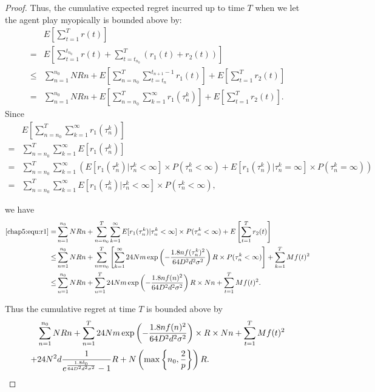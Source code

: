 \begin{proof}
Thus, the cumulative expected regret incurred up to time $T$ when we let the agent play myopically is bounded above by:
\begin{align}
&E\left[\sum_{t=1}^{T}r(t)\right] \nonumber \\
=&E\left[\sum_{t=1}^{t_{n_{0}}} r(t) + \sum_{t=t_{n_{0}}}^{T}(r_1(t)+r_2(t))\right]  \nonumber \\
\leq & \sum_{n=1}^{n_{0}}NRn + E\left[\sum_{n=n_{0}}^{T}\sum_{t=t_{n}}^{t_{n+1}-1}r_1(t)\right]+ E\left[\sum_{t=1}^{T}r_2(t)\right] \nonumber \\
=& \sum_{n=1}^{n_{0}}NRn + E\left[\sum_{n=n_{0}}^{T}\sum_{k=1}^{\infty}r_1(\tau_{n}^{k})\right]+ E\left[\sum_{t=1}^{T}r_2(t)\right]. \label{chap5:equ:r1}
\end{align}
Since
\begin{align}
& E\left[\sum_{n=n_{0}}^{T}\sum_{k=1}^{\infty}r_1(\tau_{n}^{k})\right] \nonumber\\
= &  \sum_{n=n_{0}}^{T}\sum_{k=1}^{\infty}E[r_1(\tau_{n}^{k})] \nonumber \\
= &  \sum_{n=n_{0}}^{T}\sum_{k=1}^{\infty}(E[r_1(\tau_{n}^{k})|\tau_{n}^{k}<\infty]\times P(\tau_{n}^{k}<\infty)+E[r_1(\tau_{n}^{k})|\tau_{n}^{k}=\infty]\times P(\tau_{n}^{k}=\infty)) \nonumber \\
= & \sum_{n=n_{0}}^{T}\sum_{k=1}^{\infty}E[r_1(\tau_{n}^{k})|\tau_{n}^{k}<\infty]\times P(\tau_{n}^{k}<\infty), \nonumber
\end{align}

we have
\begin{align}
\eqref{chap5:equ:r1}= & \sum_{n=1}^{n_{0}}NRn + \sum_{n=n_{0}}^{T}\sum_{k=1}^{\infty}E[r_1(\tau_{n}^{k})|\tau_{n}^{k}<\infty]\times P(\tau_{n}^{k}<\infty) + E\left[\sum_{t=1}^{T}r_2(t)\right] \nonumber \\
\leq & \sum_{n=1}^{n_{0}}NRn + \sum_{n=n_{0}}^{T}\left[\sum_{k=1}^{\infty}24Nm\exp\left(-\frac{1.8n f(\tau_{n}^{k})^2}{64 D^2 d^2\sigma^2}\right) R\times P(\tau_{n}^{k}<\infty) \right]+ \sum_{k=1}^{T}Mf(t)^2 \nonumber \\
\leq & \sum_{n=1}^{n_{0}}NRn + \sum_{n=1}^{T} 24Nm\exp\left(-\frac{1.8n f(n)^2}{64 D^2 d^2\sigma^2}\right) R \times Nn+ \sum_{t=1}^{T}Mf(t)^2. \label{chap5:equ:regret}
\end{align}

Thus the cumulative regret at time $T$ is bounded above by
\begin{align}
&\sum_{n=1}^{n_{0}}NRn + \sum_{n=1}^{T} 24Nm\exp\left(-\frac{1.8n f(n)^2}{64 D^2 d^2\sigma^2}\right)\times R \times Nn+ \sum_{t=1}^{T}Mf(t)^2 \nonumber \\
+ & 24N^2 d \frac{1}{e^{\frac{1.8\delta_{0}}{64D^2 d^2\sigma^2}}-1}R+N\left(\max\left\{n_{0},\frac{2}{p}\right\}\right)R. \nonumber
\end{align}


\end{proof}

